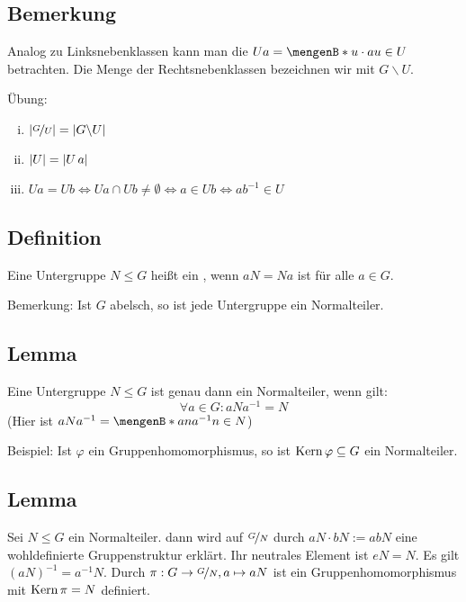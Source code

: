 \subsection[Bemerkung zu Rechtsnebenklassen]{Bemerkung} %
\label{sub:119}
Analog zu Linksnebenklassen kann man die  $U a = \set[u \cdot  a]{u \in U} $ betrachten. Die Menge der Rechtsnebenklassen bezeichnen wir mit $G \backslash U$.

Übung: 
\begin{enumerate}[(i)]
	\item $\lvert\nicefrac{G}{U}\rvert = \lvert G \backslash U\rvert  $
	\item $\lvert U\rvert = \lvert U \,a\rvert  $
	\item $U a = U b \Leftrightarrow U a \cap U b \not= \emptyset \Leftrightarrow a \in U b \Leftrightarrow a b ^{-1} \in U$
\end{enumerate} 

\subsection[Definition: Normalteiler]{Definition} %
\label{sub:120}
Eine Untergruppe $N \le G$ heißt ein , wenn $a N = N a$ ist für alle $a \in G$. 

Bemerkung: Ist $G$ abelsch, so ist jede Untergruppe ein Normalteiler.

\subsection[Lemma: Kriterium für Normalteiler]{Lemma} %
\label{sub:121}
Eine Untergruppe $N \le G$ ist genau dann ein Normalteiler, wenn gilt:
\[
	\forall a \in G : a N a ^{-1} = N
\]
(Hier ist $a N a ^{-1} = \set[a n a ^{-1}]{n \in N} $)

Beispiel: Ist $\varphi$ ein Gruppenhomomorphismus, so ist $\operatorname{Kern} \varphi \subseteq G$ ein Normalteiler.

\subsection[Lemma: Für einen Normalteiler $N$ hat $\nicefrac{G}{N}$ Gruppenstruktur]{Lemma} %
\label{sub:122}
Sei $N \le G$ ein Normalteiler. dann wird auf $\nicefrac{G}{N}$ durch $aN \cdot bN := abN$ eine wohldefinierte Gruppenstruktur erklärt. Ihr neutrales Element ist $eN=N$.
Es gilt $(aN)^{-1} = a ^{-1}N$. Durch $\pi : G \to \nicefrac{G}{N}, a \mapsto aN$ ist ein Gruppenhomomorphismus mit $\operatorname{Kern} \pi = N$ definiert.


